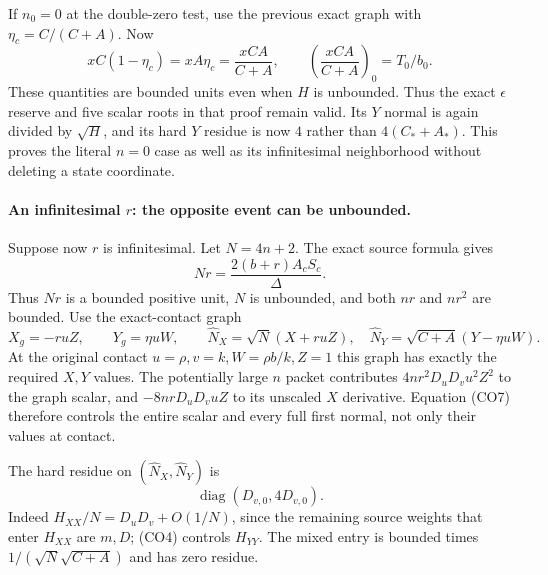 If $n_0=0$ at the double-zero test, use the previous exact graph
with $\eta_c=C/(C+A)$.  Now
\[
 xC(1-\eta_c)=xA\eta_c=\frac{xCA}{C+A},
 \qquad
 \left(\frac{xCA}{C+A}\right)_0=T_0/b_0.                \tag{CO6}
\]
These quantities are bounded units even when $H$ is unbounded.
Thus the exact $\epsilon$ reserve and five scalar roots in that
proof remain valid.  Its $Y$ normal is again divided by $\sqrt H$,
and its hard $Y$ residue is now $4$ rather than $4(C_*+A_*)$.
This proves the literal $n=0$ case as well as its infinitesimal
neighborhood without deleting a state coordinate.

\paragraph{An infinitesimal $r$: the opposite event can be unbounded.}
Suppose now $r$ is infinitesimal.  Let $N=4n+2$.  The exact source
formula gives
\[
             Nr=\frac{2(b+r)A_cS_c}{\Delta}.             \tag{CO7}
\]
Thus $Nr$ is a bounded positive unit, $N$ is unbounded, and both
$nr$ and $nr^2$ are bounded.  Use the exact-contact graph
\[
 X_g=-ruZ,\qquad Y_g=\eta uW,
 \qquad
 \widehat N_X=\sqrt N(X+ruZ),\quad
 \widehat N_Y=\sqrt{C+A}(Y-\eta uW).                    \tag{CO8}
\]
At the original contact $u=\rho,v=k,W=\rho b/k,Z=1$ this graph
has exactly the required $X,Y$ values.  The potentially large $n$
packet contributes $4nr^2D_uD_vu^2Z^2$ to the graph scalar, and
$-8nrD_uD_vuZ$ to its unscaled $X$ derivative.  Equation (CO7)
therefore controls the entire scalar and every full first normal,
not only their values at contact.

The hard residue on $(\widehat N_X,\widehat N_Y)$ is
\[
                  \operatorname{diag}(D_{v,0},4D_{v,0}). \tag{CO9}
\]
Indeed $H_{XX}/N=D_uD_v+O(1/N)$, since the remaining source
weights that enter $H_{XX}$ are $m,D$; (CO4) controls $H_{YY}$.
The mixed entry is bounded times
$1/(\sqrt N\sqrt{C+A})$ and has zero residue.

